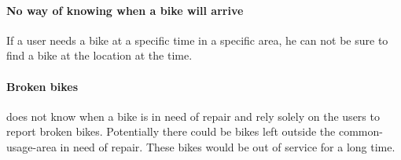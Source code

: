 \paragraph{No way of knowing when a bike will arrive}
If a user needs a bike at a specific time in a specific area, he can not be sure to find a bike at the location at the time.

\paragraph{Broken bikes}
\citybike does not know when a bike is in need of repair and rely solely on the users to report broken bikes.
Potentially there could be bikes left outside the common-usage-area in need of repair. These bikes would be out of service for a long time.
